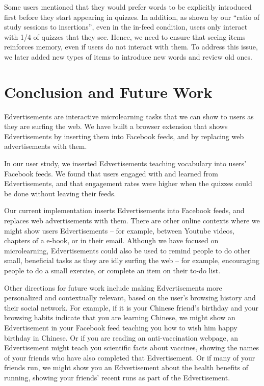 \documentclass{sigchi}
\begin{document}
Some users mentioned that they would prefer words to be explicitly introduced first before they start appearing in quizzes.  In addition, as shown by our ``ratio of study sessions to insertions'', even in the in-feed condition, users only interact with 1/4 of quizzes that they see. Hence, we need to ensure that seeing items reinforces memory, even if users do not interact with them. To address this issue, we later added new types of items to introduce new words and review old ones.

\section{Conclusion and Future Work}

Edvertisements are interactive microlearning tasks that we can show to users as they are surfing the web. We have built a browser extension that shows Edvertisements by inserting them into Facebook feeds, and by replacing web advertisements with them.

In our user study, we inserted Edvertisements teaching vocabulary into users' Facebook feeds. We found that users engaged with and learned from Edvertisements, and that engagement rates were higher when the quizzes could be done without leaving their feeds.

Our current implementation inserts Edvertisements into Facebook feeds, and replaces web advertisements with them. There are other online contexts where we might show users Edvertisements -- for example, between Youtube videos, chapters of a e-book, or in their email. Although we have focused on microlearning, Edvertisements could also be used to remind people to do other small, beneficial tasks as they are idly surfing the web -- for example, encouraging people to  do a small exercise, or complete an item on their to-do list. %

Other directions for future work include making Edvertisements more personalized and contextually relevant, based on the user's browsing history and their social network. For example, if it is your Chinese friend's birthday and your browsing habits indicate that you are learning Chinese, we might show an Edvertisement in your Facebook feed teaching you how to wish him happy birthday in Chinese. Or if you are reading an anti-vaccination webpage, an Edvertisement might teach you scientific facts about vaccines, showing the names of your friends who have also completed that Edvertisement. Or if many of your friends run, we might show you an Edvertisement about the health benefits of running, showing your friends' recent runs as part of the Edvertisement. %
\end{document}
